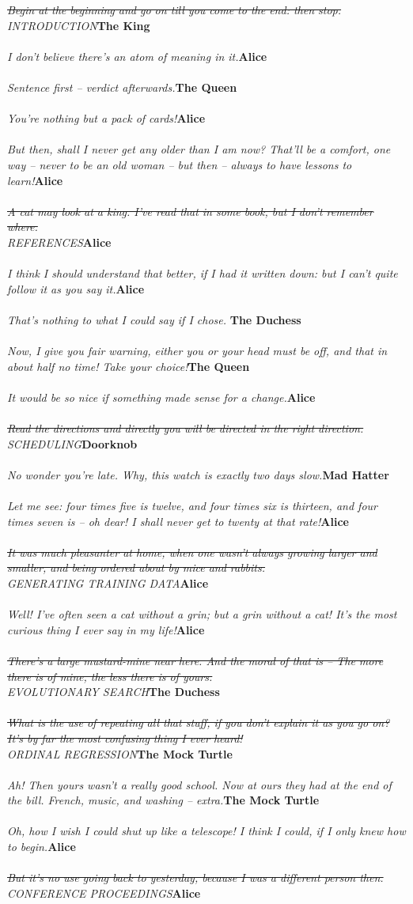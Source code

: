 \documentclass{hi-thesis}
\renewcommand{\quote}[2]{\noindent \emph{#2}\hfill{\bf #1}\\\\}
\begin{document}
\quote{The King}{\st{Begin at the beginning and go on till you come to the end: then stop.} \\INTRODUCTION}
\quote{Alice}{I don't believe there's an atom of meaning in it.}
\quote{The Queen}{Sentence first -- verdict afterwards.}
\quote{Alice}{You're nothing but a pack of cards!}
\quote{Alice}{But then, shall I never get any older than I am now? That'll be a comfort, one way -- never to be an old woman -- but then -- always to have lessons to learn!}
\quote{Alice}{\st{A cat may look at a king. I've read that in some book, but I don't remember where.}\\REFERENCES}
\quote{Alice}{I think I should understand that better, if I had it written down: but I can't quite follow it as you say it.}
\quote{The Duchess}{That's nothing to what I could say if I chose. }
\quote{The Queen}{Now, I give you fair warning, either you or your head must be off, and that in about half no time! Take your choice!}
\quote{Alice}{It would be so nice if something made sense for a change.}
\quote{Doorknob}{\st{Read the directions and directly you will be directed in the right direction.}\\SCHEDULING}
\quote{Mad Hatter}{No wonder you're late. Why, this watch is exactly two days slow.}
\quote{Alice}{Let me see: four times five is twelve, and four times six is thirteen, and four times seven is -- oh dear! I shall never get to twenty at that rate!}
\quote{Alice}{\st{It was much pleasanter at home, when one wasn't always growing larger and smaller, and being ordered about by mice and rabbits.}\\GENERATING TRAINING DATA}
\quote{Alice}{Well! I've often seen a cat without a grin; but a grin without a cat! It's the most curious thing I ever say in my life!}
\quote{The Duchess}{\st{There's a large mustard-mine near here. And the moral of that is -- The more there is of mine, the less there is of yours.}\\EVOLUTIONARY SEARCH}
\quote{The Mock Turtle}{\st{What is the use of repeating all that stuff, if you don't explain it as you go on? It's by far the most confusing thing I ever heard!}\\ORDINAL REGRESSION}
\quote{The Mock Turtle}{Ah! Then yours wasn't a really good school. Now at ours they had at the end of the bill. French, music, and washing -- extra.}
\quote{Alice}{Oh, how I wish I could shut up like a telescope! I think I could, if I only knew how to begin.}
\quote{Alice}{\st{But it's no use going back to yesterday, because I was a different person then.}\\CONFERENCE PROCEEDINGS}
\end{document}
